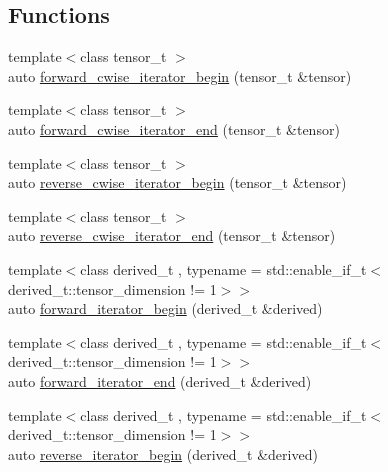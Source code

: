 \subsection*{Functions}
\begin{DoxyCompactItemize}
\item 
{\footnotesize template$<$class tensor\+\_\+t $>$ }\\auto \hyperlink{namespaceBC_1_1tensors_1_1iterators_a6176b0cf4da76fbafd60f493b45814b0}{forward\+\_\+cwise\+\_\+iterator\+\_\+begin} (tensor\+\_\+t \&tensor)
\item 
{\footnotesize template$<$class tensor\+\_\+t $>$ }\\auto \hyperlink{namespaceBC_1_1tensors_1_1iterators_ae72d661f81f196fcbc45595a700a4d2d}{forward\+\_\+cwise\+\_\+iterator\+\_\+end} (tensor\+\_\+t \&tensor)
\item 
{\footnotesize template$<$class tensor\+\_\+t $>$ }\\auto \hyperlink{namespaceBC_1_1tensors_1_1iterators_ab8fc7eb8a6e8fe8b12c5e80a28c92e45}{reverse\+\_\+cwise\+\_\+iterator\+\_\+begin} (tensor\+\_\+t \&tensor)
\item 
{\footnotesize template$<$class tensor\+\_\+t $>$ }\\auto \hyperlink{namespaceBC_1_1tensors_1_1iterators_ae162582f7745836b36d80880be1d6e3f}{reverse\+\_\+cwise\+\_\+iterator\+\_\+end} (tensor\+\_\+t \&tensor)
\item 
{\footnotesize template$<$class derived\+\_\+t , typename  = std\+::enable\+\_\+if\+\_\+t$<$derived\+\_\+t\+::tensor\+\_\+dimension != 1$>$$>$ }\\auto \hyperlink{namespaceBC_1_1tensors_1_1iterators_ad5a7df249f796c25a5fcd0c52da26c94}{forward\+\_\+iterator\+\_\+begin} (derived\+\_\+t \&derived)
\item 
{\footnotesize template$<$class derived\+\_\+t , typename  = std\+::enable\+\_\+if\+\_\+t$<$derived\+\_\+t\+::tensor\+\_\+dimension != 1$>$$>$ }\\auto \hyperlink{namespaceBC_1_1tensors_1_1iterators_afc832b6ee25709001bff144c3eda9a54}{forward\+\_\+iterator\+\_\+end} (derived\+\_\+t \&derived)
\item 
{\footnotesize template$<$class derived\+\_\+t , typename  = std\+::enable\+\_\+if\+\_\+t$<$derived\+\_\+t\+::tensor\+\_\+dimension != 1$>$$>$ }\\auto \hyperlink{namespaceBC_1_1tensors_1_1iterators_af51dc9f536ca1d7711bfae6da602a718}{reverse\+\_\+iterator\+\_\+begin} (derived\+\_\+t \&derived)
\item 

\end{DoxyCompactItemize}
